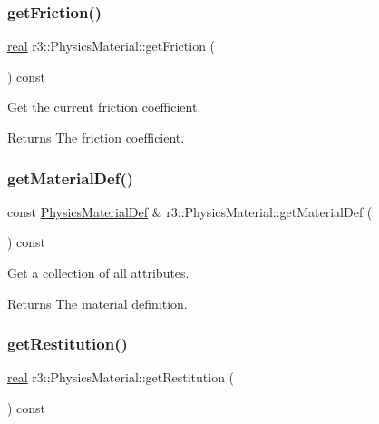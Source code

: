 \subsubsection{\texorpdfstring{get\+Friction()}{getFriction()}}
{\footnotesize\ttfamily \mbox{\hyperlink{namespacer3_ab2016b3e3f743fb735afce242f0dc1eb}{real}} r3\+::\+Physics\+Material\+::get\+Friction (\begin{DoxyParamCaption}{ }\end{DoxyParamCaption}) const}



Get the current friction coefficient. 

\begin{DoxyReturn}{Returns}
The friction coefficient. 
\end{DoxyReturn}
\mbox{\label{classr3_1_1_physics_material_a652318d9fa4f6db099dc58d6f6ae314a}} 
\subsubsection{\texorpdfstring{get\+Material\+Def()}{getMaterialDef()}}
{\footnotesize\ttfamily const \mbox{\hyperlink{structr3_1_1_physics_material_def}{Physics\+Material\+Def}} \& r3\+::\+Physics\+Material\+::get\+Material\+Def (\begin{DoxyParamCaption}{ }\end{DoxyParamCaption}) const}



Get a collection of all attributes. 

\begin{DoxyReturn}{Returns}
The material definition. 
\end{DoxyReturn}
\mbox{\label{classr3_1_1_physics_material_a555b73c2bde3679b0e40087455eab61e}} 
\subsubsection{\texorpdfstring{get\+Restitution()}{getRestitution()}}
{\footnotesize\ttfamily \mbox{\hyperlink{namespacer3_ab2016b3e3f743fb735afce242f0dc1eb}{real}} r3\+::\+Physics\+Material\+::get\+Restitution (\begin{DoxyParamCaption}{ }\end{DoxyParamCaption}) const}



